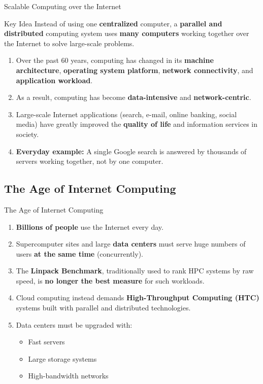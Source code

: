 \begin{frame}{Scalable Computing over the Internet}
\begin{block}{Key Idea}
Instead of using one \textbf{centralized} computer, a \textbf{parallel and distributed} computing system uses \textbf{many computers} working together over the Internet to solve large-scale problems.
\end{block}
\vspace{0.2cm}
\begin{enumerate}
\item<1-> Over the past 60 years, computing has changed in its \textbf{machine architecture}, \textbf{operating system platform}, \textbf{network connectivity}, and \textbf{application workload}.
\item<2-> As a result, computing has become \textbf{data-intensive} and \textbf{network-centric}.
\item<3-> Large-scale Internet applications (search, e-mail, online banking, social media) have greatly improved the \textbf{quality of life} and information services in society.
\item<4-> \textbf{Everyday example:} A single Google search is answered by thousands of servers working together, not by one computer.
\end{enumerate}
\end{frame}

\subsection{The Age of Internet Computing}

\begin{frame}{The Age of Internet Computing}
\begin{enumerate}
\item<1-> \textbf{Billions of people} use the Internet every day.
\item<2-> Supercomputer sites and large \textbf{data centers} must serve huge numbers of users \textbf{at the same time} (concurrently).
\item<3-> The \textbf{Linpack Benchmark}, traditionally used to rank HPC systems by raw speed, is \textbf{no longer the best measure} for such workloads.
\item<4-> Cloud computing instead demands \textbf{High-Throughput Computing (HTC)} systems built with parallel and distributed technologies.
\item<5-> Data centers must be upgraded with:
    \begin{itemize}
    \item Fast servers
    \item Large storage systems
    \item High-bandwidth networks
    \end{itemize}
\end{enumerate}
\end{frame}

